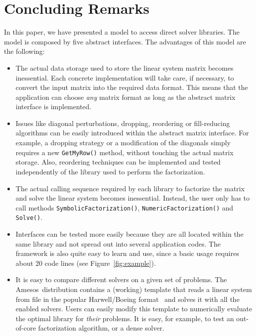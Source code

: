 \documentclass[acmtocl]{acmtrans2m}
\newcommand{\amesos}{{\sc Amesos}}
\begin{document}
\section{Concluding Remarks}
\label{sec:conclusions}

In this paper, we have presented a model to access direct
solver libraries. The model is composed by five abstract interfaces.
The advantages of this model are the following:
\begin{itemize}

\item The actual data storage used to store the linear system matrix becomes inessential.
Each concrete implementation will take care, if necessary, to convert the
input matrix into the required data format. This means that the
application can choose {\sl any} matrix format as long as the abstract
matrix interface is implemented.

\item Issues like diagonal perturbations, dropping, reordering or
fill-reducing algorithms 
can be easily introduced within the abstract matrix interface.
For example, a dropping strategy or a modification of the diagonals simply
requires a new \verb!GetMyRow()! method, without touching the actual matrix
storage. Also, reordering techniques can be implemented and tested
independently of the library used to perform the factorization.

\item The actual calling sequence required by each library to factorize the
matrix and solve the linear system becomes inessential. Instead, the user only
has to call methods \verb!SymbolicFactorization()!, \verb!NumericFactorization()! and
\verb!Solve()!.

\item Interfaces can be tested more easily because they are all located within
the same library and not spread out into several application codes. The
framework is also quite easy to learn and use, since a basic usage 
requires about 20 code lines (see Figure~\ref{fig:example}).

\item It is easy to compare different solvers on a given set of problems. The
\amesos\ distribution contains a (working) template that reads a linear system
from file in the popular Harwell/Boeing format~\cite{duff89sparse} and solves it with all the
enabled solvers. Users can easily modify this template to numerically evaluate
the optimal library for {\sl their} problems.
It is easy, for example, to test an out-of-core factorization algorithm, or a
dense solver.


\end{itemize}
\end{document}
